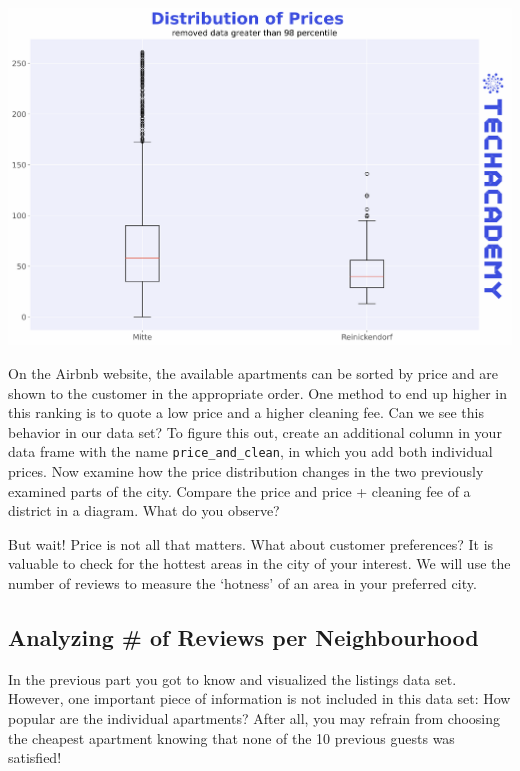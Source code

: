 \documentclass[
  11pt,
]{article}
\begin{document}
\begin{center}\includegraphics[width=1\linewidth]{plot/01_python/box_plots} \end{center}

On the Airbnb website, the available apartments can be sorted by price and are shown to the customer in the appropriate order. One method to end up higher in this ranking is to quote a low price and a higher cleaning fee. Can we see this behavior in our data set? To figure this out, create an additional column in your data frame with the name \texttt{price\_and\_clean}, in which you add both individual prices. Now examine how the price distribution changes in the two previously examined parts of the city. Compare the price and price + cleaning fee of a district in a diagram. What do you observe?

But wait! Price is not all that matters. What about customer preferences? It is valuable to check for the hottest areas in the city of your interest. We will use the number of reviews to measure the `hotness' of an area in your preferred city.

\hypertarget{analyzing-of-reviews-per-neighbourhood}{%
\subsection{Analyzing \# of Reviews per Neighbourhood}\label{analyzing-of-reviews-per-neighbourhood}}

In the previous part you got to know and visualized the listings data set. However, one important piece of information is not included in this data set: How popular are the individual apartments? After all, you may refrain from choosing the cheapest apartment knowing that none of the 10 previous guests was satisfied!
\end{document}
